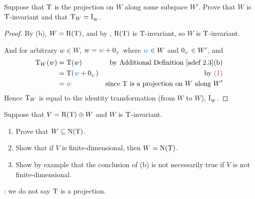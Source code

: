 \begin{exercise} \label{exercise 2.1.31}
Suppose that \(\mathrm{T}\) is the projection on \(W\) along some subspace \(W'\).
Prove that \(W\) is \(\mathrm{T}\)-invariant and that \(\mathrm{T}_W = \mathrm{I}_{_W}\).
\end{exercise}

\begin{proof}
By (b), \(W = \mathrm{R(T)}\), and by , \(\mathrm{R(T)}\) is \(\mathrm{T}\)-invariant, so \(W\) is \(\mathrm{T}\)-invariant.

And for arbitrary \(w \in W\), \(w = \BLUE{w} + \OV\)  where \(\BLUE{w} \in W\) and \(0_{_V} \in W'\), and
\begin{align*}
    \T_W(w) & = \T(w) & \text{by \ADEF{2.3}(b)} \\
            & = \T(\BLUE{w} + \OV) & \text{by \MAROON{(1)}} \\
            & = \BLUE{w} & \text{since \(\T\) is a projection on \(W\) along \(W'\)}
\end{align*}
Hence \(\mathrm{T}_W\) is equal to the identity transformation (from \(W\) to \(W\)), \(\mathrm{I}_{_W}\).
\end{proof}

\begin{exercise} \label{exercise 2.1.32}
Suppose that \(V = \mathrm{R(T)} \oplus W\) and \(W\) is \(\mathrm{T}\)-invariant.
\begin{enumerate}
\item Prove that \(W \subseteq \mathrm{N(T)}\).
\item Show that if \(V\) is finite-dimensional, then \(W = \mathrm{N(T)}\).
\item Show by example that the conclusion of (b) is not necessarily true if \(V\) is not finite-dimensional.
\end{enumerate}

: we do not say \(\mathrm{T}\) is a projection.
\end{exercise}

